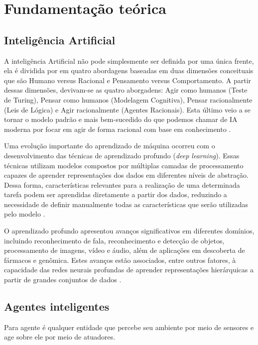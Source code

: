 \chapter{Fundamentação teórica}
\label{cap:fundamentacao}

\section{Inteligência Artificial}
A inteligência Artificial não pode simplesmente ser definida por uma única frente, ela é dividida por  em quatro abordagens baseadas em duas dimensões conceituais que são Humano versus Racional e Pensamento versus Comportamento.
A partir dessas dimensões, devivam-se as quatro aborgadens: Agir como humanos (Teste de Turing), Pensar como humanos (Modelagem Cognitiva),
Pensar racionalmente (Leis de Lógica) e Agir racionalmente (Agentes Racionais). Esta último veio a se tornar o modelo padrão e mais bem-sucedido do que podemos chamar de IA moderna por focar em agir de forma racional com base em conhecimento \cite[p. 22]{russell2021artificial}.

Uma evolução importante do aprendizado de máquina ocorreu com o
desenvolvimento das técnicas de aprendizado profundo (\textit{deep learning}).
Essas técnicas utilizam modelos compostos por múltiplas camadas de
processamento capazes de aprender representações dos dados em diferentes níveis de abstração. Dessa forma, características relevantes para a realização de uma determinada tarefa podem ser aprendidas diretamente a partir dos dados, reduzindo a necessidade de definir manualmente todas as características que serão utilizadas pelo modelo \cite{lecun2015deep}.

O aprendizado profundo apresentou avanços significativos em diferentes
domínios, incluindo reconhecimento de fala, reconhecimento e detecção de
objetos, processamento de imagens, vídeo e áudio, além de aplicações em
descoberta de fármacos e genômica. Estes avanços estão associados, entre outros
fatores, à capacidade das redes neurais profundas de aprender representações
hierárquicas a partir de grandes conjuntos de dados
\cite{lecun2015deep}.

\section{Agentes inteligentes}
\label{sec:agentes-inteligentes}

Para  agente é qualquer entidade que percebe seu ambiente por meio de sensores e age sobre ele por meio de atuadores.

